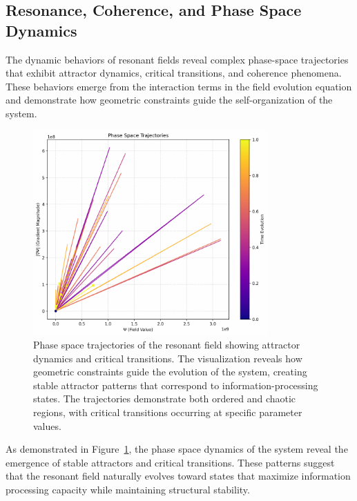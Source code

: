 \documentclass[12pt,letterpaper]{article}
\begin{document}
\vspace{2mm}
\subsection{Resonance, Coherence, and Phase Space Dynamics}
\label{subsec:resonance_coherence}

The dynamic behaviors of resonant fields reveal complex phase-space trajectories that exhibit attractor dynamics, critical transitions, and coherence phenomena. These behaviors emerge from the interaction terms in the field evolution equation and demonstrate how geometric constraints guide the self-organization of the system.

\begin{figure}[H]
    \centering
    \includegraphics[width=0.8\textwidth]{figures/phase_space_trajectories.pdf}
    \caption{Phase space trajectories of the resonant field showing attractor dynamics and critical transitions. The visualization reveals how geometric constraints guide the evolution of the system, creating stable attractor patterns that correspond to information-processing states. The trajectories demonstrate both ordered and chaotic regions, with critical transitions occurring at specific parameter values.}
    \label{fig:phase_space}
\end{figure}

As demonstrated in Figure~\ref{fig:phase_space}, the phase space dynamics of the system reveal the emergence of stable attractors and critical transitions. These patterns suggest that the resonant field naturally evolves toward states that maximize information processing capacity while maintaining structural stability.
\end{document}
